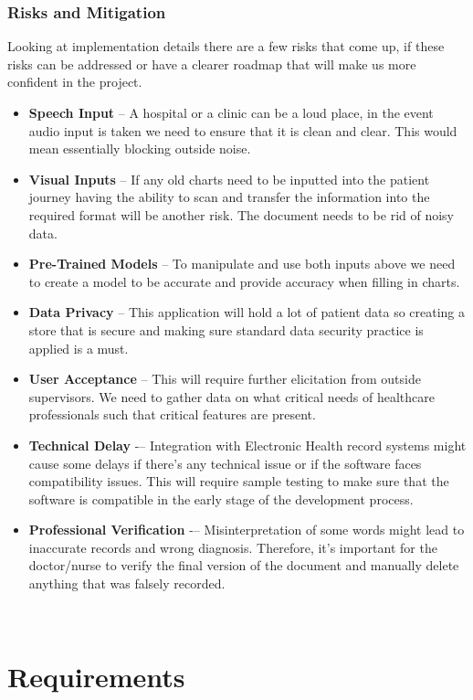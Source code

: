 \documentclass[12pt]{article}
\begin{document}
\subsubsection{Risks and Mitigation}

Looking at implementation details there are a few risks that come up, if these risks can be addressed or have a clearer roadmap that will make us more confident in the project. 

\begin{itemize}
  \item \textbf{Speech Input} -- A hospital or a clinic can be a loud place, in the event audio input is taken we need to ensure that it is clean and clear. This would mean essentially blocking outside noise. 
  \item \textbf{Visual Inputs} -- If any old charts need to be inputted into the patient journey having the ability to scan and transfer the information into the required format will be another risk. The document needs to be rid of noisy data.
  \item \textbf{Pre-Trained Models} -- To manipulate and use both inputs above we need to create a model to be accurate and provide accuracy when filling in charts. 
  \item \textbf{Data Privacy} -- This application will hold a lot of patient data so creating a store that is secure and making sure standard data security practice is applied is a must.
  \item \textbf{User Acceptance} -- This will require further elicitation from outside supervisors. We need to gather data on what critical needs of healthcare professionals such that critical features are present.
  \item \textbf{Technical Delay} -– Integration with Electronic Health record systems might cause some delays if there’s any technical issue or if the software faces compatibility issues. This will require sample testing to make sure that the software is compatible in the early stage of the development process.
  \item \textbf{Professional Verification} -– Misinterpretation of some words might lead to inaccurate records and wrong diagnosis. Therefore, it’s important for the doctor/nurse to verify the final version of the document and manually delete anything that was falsely recorded. 
\end{itemize}

~\newpage

\section{Requirements} \label{sec_Requirements}
\end{document}
